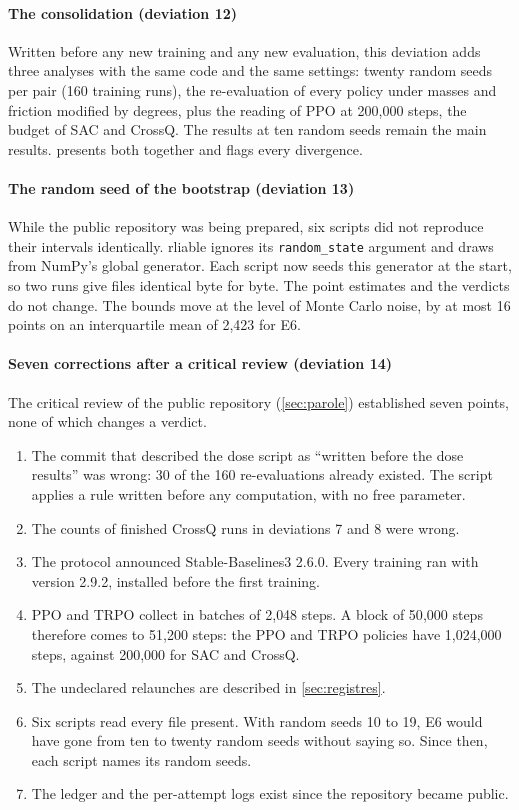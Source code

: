 \paragraph{The consolidation (deviation 12)} Written before any new training and
any new evaluation, this deviation adds three analyses with the same code and the same settings:
twenty random seeds per pair (160 training runs), the re-evaluation of every policy under masses and
friction modified by degrees, plus the reading of PPO at 200{,}000 steps, the budget of SAC and
CrossQ. The results at ten random seeds remain the main results. 
presents both together and flags every divergence.

\paragraph{The random seed of the bootstrap (deviation 13)} While the public repository was being
prepared, six scripts did not reproduce their intervals identically. rliable ignores its
\texttt{random\_state} argument and draws from NumPy's global generator. Each script now seeds this
generator at the start, so two runs give files identical byte for byte. The point estimates and the
verdicts do not change. The bounds move at the level of Monte Carlo noise, by at most 16 points on an
interquartile mean of 2{,}423 for E6.

\paragraph{Seven corrections after a critical review (deviation 14)} The critical review of the
public repository (\cref{sec:parole}) established seven points, none of which changes a verdict.
\begin{enumerate}[label=(\alph*)]
  \item The commit that described the dose script as \enquote{written before the dose results} was
        wrong: 30 of the 160 re-evaluations already existed. The script applies a rule written
        before any computation, with no free parameter.
  \item The counts of finished CrossQ runs in deviations 7 and 8 were wrong.
  \item The protocol announced Stable-Baselines3 2.6.0. Every training ran with version 2.9.2,
        installed before the first training.
  \item PPO and TRPO collect in batches of 2{,}048 steps. A block of 50{,}000 steps therefore comes
        to 51{,}200 steps: the PPO and TRPO policies have 1{,}024{,}000 steps, against 200{,}000 for SAC
        and CrossQ.
  \item The undeclared relaunches are described in \cref{sec:registres}.
  \item Six scripts read every file present. With random seeds 10 to 19, E6 would have gone from ten
        to twenty random seeds without saying so. Since then, each script names its random seeds.
  \item The ledger  and the per-attempt logs exist since the repository became public.
\end{enumerate}

